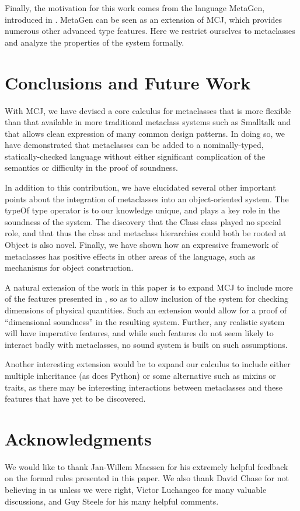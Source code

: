 \documentclass{acmconfbig}
\begin{document}
Finally, the motivation for this work comes from the language MetaGen,
introduced in \cite{DimUnits}.  MetaGen can be seen as an extension of
MCJ, which provides numerous other advanced type features.  Here we
restrict ourselves to metaclasses and analyze the properties of the
system formally.

\section{Conclusions and Future Work}
\label{future}
With MCJ, we have devised a core calculus for metaclasses that is more
flexible than that available in more traditional metaclass systems
such as Smalltalk and that allows clean expression of many common
design patterns.  In doing so, we have demonstrated that metaclasses
can be added to a nominally-typed, statically-checked language without
either significant complication of the semantics or difficulty in the
proof of soundness.

In addition to this contribution, we have elucidated several other
important points about the integration of metaclasses into an
object-oriented system.  The {\txt typeOf} type operator is to our
knowledge unique, and plays a key role in the soundness of the
system.  The discovery that the {\txt Class} class played no special
role, and that thus the class and metaclass hierarchies could both be
rooted at {\txt Object} is also novel.  Finally, we have shown how an
expressive framework of metaclasses has positive effects in other
areas of the language, such as mechanisms for object construction.  

A natural extension of the work in this paper is to expand MCJ to
include more of the features presented in \cite{DimUnits}, so as to
allow inclusion of the system for checking dimensions of physical
quantities. Such an extension would allow for a proof of ``dimensional
soundness'' in the resulting system.  Further, any realistic system
will have imperative features, and while such features do not seem
likely to interact badly with metaclasses, no sound system is built on
such assumptions.  

Another interesting extension would be to expand our calculus to
include either multiple inheritance (as does Python) or some
alternative such as mixins or traits, as there may be interesting
interactions between metaclasses and these features that have yet to
be discovered.

\section*{Acknowledgments}

We would like to thank Jan-Willem Maessen for his extremely helpful
feedback on the formal rules presented in this paper.  We also thank
David Chase for not believing in us unless we were right, Victor
Luchangco for many valuable discussions, and Guy Steele for his many
helpful comments.




\end{document}
